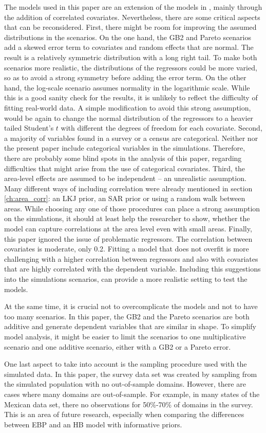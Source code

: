 The models used in this paper are an extension of the models in \cite{rojas_perilla_data_2020}, mainly through the addition of correlated covariates.
Nevertheless, there are some critical aspects that can be reconsidered.
First, there might be room for improving the assumed distributions in the scenarios.
On the one hand, the GB2 and Pareto scenarios add a skewed error term to covariates and random effects that are normal.
The result is a relatively symmetric distribution with a long right tail.
To make both scenarios more realistic, the distributions of the regressors could be more varied, so as to avoid a strong symmetry before adding the error term.
On the other hand, the log-scale scenario assumes normality in the logarithmic scale.
While this is a good sanity check for the results, it is unlikely to reflect the difficulty of fitting real-world data.
A simple modification to avoid this strong assumption, would be again to change the normal distribution of the regressors to a heavier tailed Student's $t$ with different the degrees of freedom for each covariate.
Second, a majority of variables found in a survey or a census are categorical.
Neither \cite{rojas_perilla_data_2020} nor the present paper include categorical variables in the simulations.
Therefore, there are probably some blind spots in the analysis of this paper, regarding difficulties that might arise from the use of categorical covariates.
Third, the area-level effects are assumed to be independent – an unrealistic assumption.
Many different ways of including correlation were already mentioned in section \ref{ch:area_corr}: an LKJ prior, an SAR prior or using a random walk between areas.
While choosing any one of those procedures can place a strong assumption on the simulations, it should at least help the researcher to show, whether the model can capture correlations at the area level even with small areas.
Finally, this paper ignored the issue of problematic regressors.
The correlation between covariates is moderate, only 0.2.
Fitting a model that does not overfit is more challenging with a higher correlation between regressors and also with covariates that are highly correlated with the dependent variable.
Including this suggestions into the simulations scenarios, can provide a more realistic setting to test the models.

At the same time, it is crucial not to overcomplicate the models and not to have too many scenarios.
In this paper, the GB2 and the Pareto scenarios are both additive and generate dependent variables that are similar in shape.
To simplify model analysis, it might be easier to limit the scenarios to one multiplicative scenario and one additive scenario, either with a GB2 or a Pareto error.

One last aspect to take into account is the sampling procedure used with the simulated data.
In this paper, the survey data set was created by sampling from the simulated population with no out-of-sample domains.
However, there are cases where many domains are out-of-sample.
For example, in many states of the Mexican data set, there no observations for 50\%-70\% of domains in the survey.
This is an area of future research, especially when comparing the differences between EBP and an HB model with informative priors.


